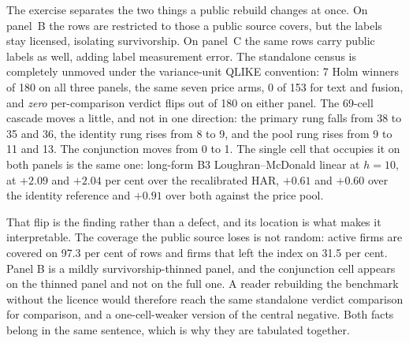 The exercise separates the two things a public rebuild changes at once. On
panel~B the rows are restricted to those a public source covers, but the
labels stay licensed, isolating survivorship. On panel~C the same rows
carry public labels as well, adding label measurement error. The standalone
census is completely unmoved under the variance-unit QLIKE convention: 7 Holm winners of 180 on all three panels,
the same seven price arms, 0 of 153 for text and fusion, and \emph{zero}
per-comparison verdict flips out of 180 on either panel. The 69-cell
cascade moves a little, and not in one direction: the primary rung falls
from 38 to 35 and 36, the identity rung rises from 8 to 9, and the pool
rung rises from 9 to 11 and 13. The conjunction moves from 0 to 1. The
single cell that occupies it on both panels is the same one: long-form
B3 Loughran--McDonald linear at $h{=}10$, at $+2.09$ and $+2.04$ per cent
over the recalibrated HAR, $+0.61$ and $+0.60$ over the identity reference and
$+0.91$ over both against the price pool. %

That flip is the finding rather than a defect, and its location is what
makes it interpretable. The coverage the public source loses is not random:
active firms are covered on 97.3 per cent of rows and firms that left the
index on 31.5 per cent. Panel B is a mildly survivorship-thinned
panel, and the conjunction cell appears on the thinned panel and not on the
full one. A reader rebuilding the benchmark without the licence would therefore
reach the same standalone verdict comparison for comparison, and a
one-cell-weaker version of the central negative. Both facts belong in the
same sentence, which is why they are tabulated together.

